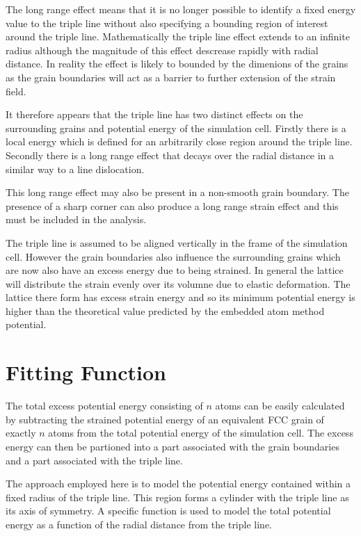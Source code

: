 \documentclass[12pt,a4paper]{book}
\begin{document}
The long range effect means that it is no longer possible to identify a fixed energy value to the triple line without also specifying a bounding region of interest around the triple line. Mathematically the triple line effect extends to an infinite radius although the magnitude of this effect descrease rapidly with radial distance. In reality the effect is likely to bounded by the dimenions of the grains as the grain boundaries will act as a barrier to further extension of the strain field. 

It therefore appears that the triple line has two distinct effects on the surrounding grains and potential energy of the simulation cell. Firstly there is a local energy which is defined for an arbitrarily close region around the triple line. Secondly there is a long range effect that decays over the radial distance in a similar way to a line dislocation.

This long range effect may also be present in a non-smooth grain boundary. The presence of a sharp corner can also produce a long range strain effect and this must be included in the analysis.

The triple line is assumed to be aligned vertically in the frame of the simulation cell. However the grain boundaries also influence the surrounding grains which are now also have an excess energy due to being strained. In general the lattice will distribute the strain evenly over its volumne due to elastic deformation. The lattice there form has excess strain energy and so its minimum  potential energy is higher than the theoretical value predicted by the embedded atom method potential.

\section{Fitting Function}

The total excess potential energy consisting of $n$ atoms can be easily calculated by subtracting the strained potential energy of an equivalent FCC grain of exactly $n$ atoms from the total potential energy of the simulation cell. The excess energy can then be partioned into a part associated with the grain boundaries and a part associated with the triple line.

The approach employed here is to model the potential energy contained within a fixed radius of the triple line. This region forms a cylinder with the triple line as its axis of symmetry. A specific function is used to model the total potential energy as a function of the radial distance from the triple line. 
\end{document}
